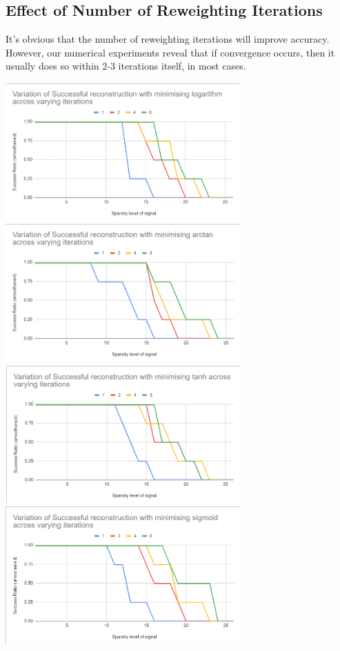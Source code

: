\documentclass[a4paper,14pt]{article}
\numberwithin{definition}{section}
\numberwithin{mytheorem}{subsection}
\begin{document}
\subsection{Effect of Number of Reweighting Iterations}
It's obvious that the number of reweighting iterations will improve accuracy. However, our numerical experiments reveal that if convergence occurs, then it usually does so within 2-3 iterations itself, in most cases.

\begin{center}
    \includegraphics[width=9cm]{log_iterations.png}
    \includegraphics[width=9cm]{atan_iterations.png}
    \includegraphics[width=9cm]{tanh_iterations.png}
    \includegraphics[width=9cm]{sigmoid_iterations.png}
\end{center}
\end{document}
